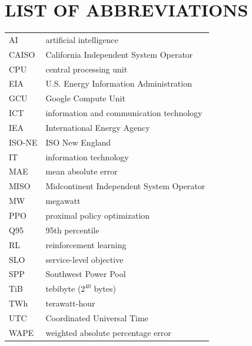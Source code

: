 \documentclass{UNCC-thesis}
\begin{document}
\chapter*{LIST OF ABBREVIATIONS}
\begin{singlespace}
\noindent
\begin{tabular}{@{}L{0.18\textwidth}L{0.78\textwidth}@{}}
  AI     & artificial intelligence \\[4pt]
  CAISO  & California Independent System Operator \\[4pt]
  CPU    & central processing unit \\[4pt]
  EIA    & U.S. Energy Information Administration \\[4pt]
  GCU    & Google Compute Unit \\[4pt]
  ICT    & information and communication technology \\[4pt]
  IEA    & International Energy Agency \\[4pt]
  ISO-NE & ISO New England \\[4pt]
  IT     & information technology \\[4pt]
  MAE    & mean absolute error \\[4pt]
  MISO   & Midcontinent Independent System Operator \\[4pt]
  MW     & megawatt \\[4pt]
  PPO    & proximal policy optimization \\[4pt]
  Q95    & 95th percentile \\[4pt]
  RL     & reinforcement learning \\[4pt]
    SLO    & service-level objective \\[4pt]
  SPP    & Southwest Power Pool \\[4pt]
  TiB    & tebibyte (\(2^{40}\) bytes) \\[4pt]
  TWh    & terawatt-hour \\[4pt]
  UTC    & Coordinated Universal Time \\[4pt]
  WAPE   & weighted absolute percentage error \\
\end{tabular}
\end{singlespace}
\end{document}
